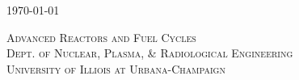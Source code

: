 \documentclass[14pt,a4paper]{article} %
\begin{document}
\begin{titlepage}
    
    \vspace{0.5cm} %
    {\large\today} %
    \vspace{0.5cm}

    
    \textsc{\LARGE Advanced Reactors and Fuel Cycles}\\[0.25cm] %
    
    \textsc{\large Dept. of Nuclear, Plasma, \& Radiological Engineering}\\%
    
    \textsc{\large University of Illiois at Urbana-Champaign}\\ %


    
    

\end{titlepage}
\end{document}
